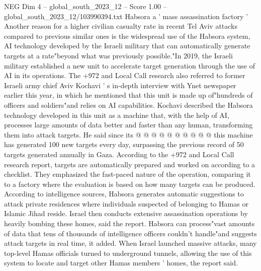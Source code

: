\begin{textsample}{NEG Dim 4 – global\_south\_2023\_12 – Score 1.00 – global\_south\_2023\_12/103990394.txt}
Habsora a ' mass assassination factory ' Another reason for a higher civilian casualty rate in recent Tel Aviv attacks compared to previous similar ones is the widespread use of the Habsora system, AI technology developed by the Israeli military that can automatically generate targets at a rate"beyond what was previously possible."In 2019, the Israeli military established a new unit to accelerate target generation through the use of AI in its operations.
The +972 and Local Call research also referred to former Israeli army chief Aviv Kochavi ' s in-depth interview with Ynet newspaper earlier this year, in which he mentioned that this unit is made up of"hundreds of officers and soldiers"and relies on AI capabilities.
Kochavi described the Habsora technology developed in this unit as a machine that, with the help of AI, processes large amounts of data better and faster than any human, transforming them into attack targets.
He said since its @ @ @ @ @ @ @ @ @ @ this machine has generated 100 new targets every day, surpassing the previous record of 50 targets generated annually in Gaza.
According to the +972 and Local Call research report, targets are automatically prepared and worked on according to a checklist.
They emphasized the fast-paced nature of the operation, comparing it to a factory where the evaluation is based on how many targets can be produced.
According to intelligence sources, Habsora generates automatic suggestions to attack private residences where individuals suspected of belonging to Hamas or Islamic Jihad reside.
Israel then conducts extensive assassination operations by heavily bombing these homes, said the report.
Habsora can process"vast amounts of data that tens of thousands of intelligence officers couldn't handle"and suggests attack targets in real time, it added.
When Israel launched massive attacks, many top-level Hamas officials turned to underground tunnels, allowing the use of this system to locate and target other Hamas members ' homes, the report said.

\end{textsample}
